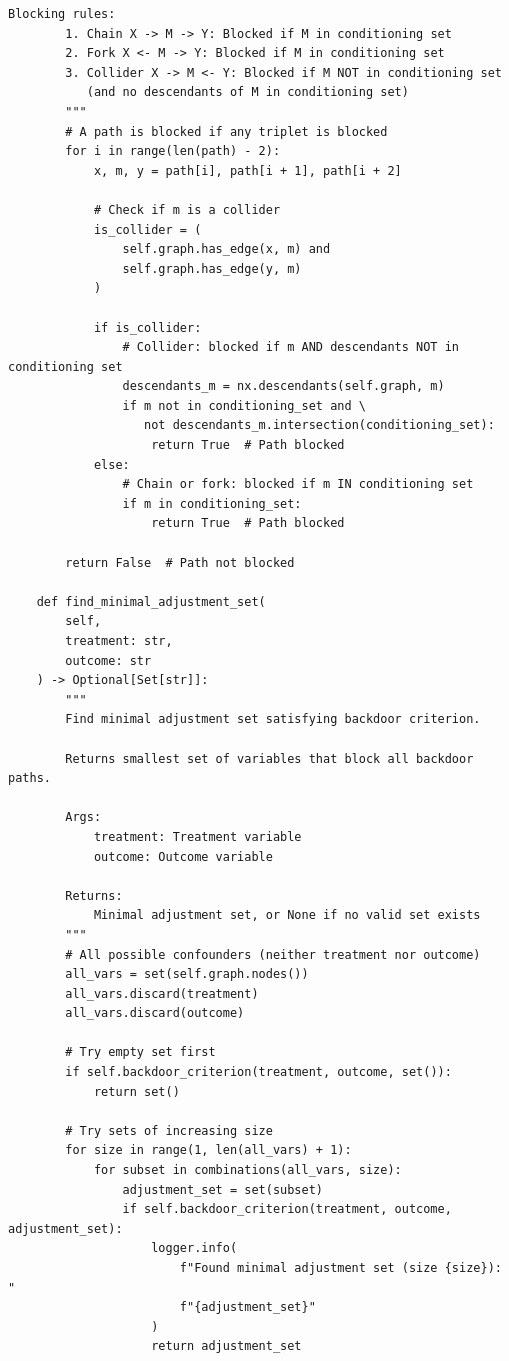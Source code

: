 \begin{lstlisting}[style=python, caption={DAG-based causal inference with backdoor criterion}]
        Blocking rules:
        1. Chain X -> M -> Y: Blocked if M in conditioning set
        2. Fork X <- M -> Y: Blocked if M in conditioning set
        3. Collider X -> M <- Y: Blocked if M NOT in conditioning set
           (and no descendants of M in conditioning set)
        """
        # A path is blocked if any triplet is blocked
        for i in range(len(path) - 2):
            x, m, y = path[i], path[i + 1], path[i + 2]

            # Check if m is a collider
            is_collider = (
                self.graph.has_edge(x, m) and
                self.graph.has_edge(y, m)
            )

            if is_collider:
                # Collider: blocked if m AND descendants NOT in conditioning set
                descendants_m = nx.descendants(self.graph, m)
                if m not in conditioning_set and \
                   not descendants_m.intersection(conditioning_set):
                    return True  # Path blocked
            else:
                # Chain or fork: blocked if m IN conditioning set
                if m in conditioning_set:
                    return True  # Path blocked

        return False  # Path not blocked

    def find_minimal_adjustment_set(
        self,
        treatment: str,
        outcome: str
    ) -> Optional[Set[str]]:
        """
        Find minimal adjustment set satisfying backdoor criterion.

        Returns smallest set of variables that block all backdoor paths.

        Args:
            treatment: Treatment variable
            outcome: Outcome variable

        Returns:
            Minimal adjustment set, or None if no valid set exists
        """
        # All possible confounders (neither treatment nor outcome)
        all_vars = set(self.graph.nodes())
        all_vars.discard(treatment)
        all_vars.discard(outcome)

        # Try empty set first
        if self.backdoor_criterion(treatment, outcome, set()):
            return set()

        # Try sets of increasing size
        for size in range(1, len(all_vars) + 1):
            for subset in combinations(all_vars, size):
                adjustment_set = set(subset)
                if self.backdoor_criterion(treatment, outcome, adjustment_set):
                    logger.info(
                        f"Found minimal adjustment set (size {size}): "
                        f"{adjustment_set}"
                    )
                    return adjustment_set


\end{lstlisting}
